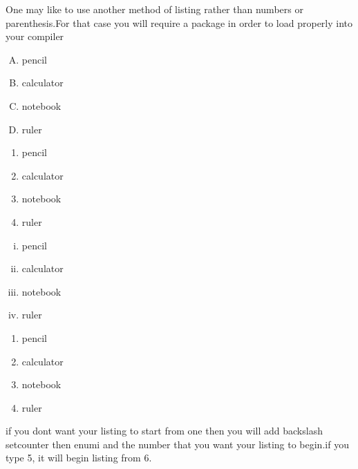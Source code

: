 \documentclass[a4paper,12pt]{article}
\begin{document}
  	 \vspace{1cm}
  	 
  	 One may like  to use another method of listing rather than numbers or parenthesis.For that case you will require a package in order to load properly into your compiler\\
  	\begin {enumerate}[A.]
  	 \item pencil
  	 \item calculator
  	 \item notebook
  	 \item ruler
  	 \end{enumerate}
  	 
  	 \vspace{3cm}
  	 	\begin {enumerate}[1.]
  	 \item pencil
  	 \item calculator
  	 \item notebook
  	 \item ruler
  	 \end{enumerate}
  	 \vspace{0.1cm}
  	 \begin {enumerate}[i.]
  	 \item pencil
  	 \item calculator
  	 \item notebook
  	 \item ruler
  	 \end{enumerate}
  	 
  	 \vspace{0.1cm}
  	 
  	 \begin {enumerate}[.]
  	 \item pencil
  	 \item calculator
  	 \item notebook
  	 \item ruler
  	 \end{enumerate}
  	 
  	 if you dont want your listing to start from one then you will add backslash setcounter then enumi and the number that you want your listing to begin.if you type 5, it will begin listing from 6.\\
  	 
\end{document}
